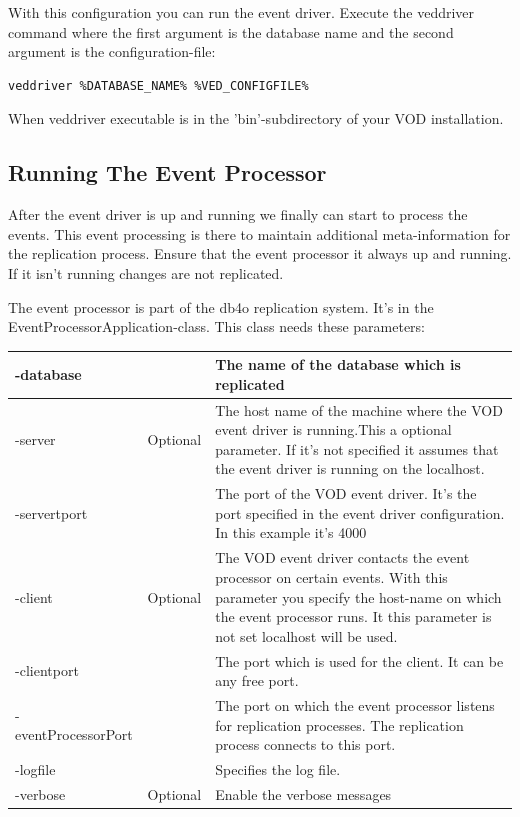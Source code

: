 With this configuration you can run the event driver. Execute the veddriver command where the first argument is the database name and the second argument is the configuration-file:

\begin{lstlisting}
veddriver %DATABASE_NAME% %VED_CONFIGFILE%
\end{lstlisting}

When veddriver executable is in the 'bin'-subdirectory of your VOD installation.

\subsection{Running The Event Processor}
\label{drs:db4o-replication-system-drs-vod-setup-event-processing:eventprocessor}

After the event driver is up and running we finally can start to process the events. This event processing is there to maintain additional meta-information for the replication process. Ensure that the event processor it always up and running. If it isn't running changes are not replicated.

The event processor is part of the db4o replication system. It's in the EventProcessorApplication-class. This class needs these parameters:

{\small
\begin{longtable}{|p{}|p{}|p{}|}
\hline
-database &  & The name of the database which is replicated \\ \hline
-server & Optional & The host name of the machine where the VOD event driver is running.This a optional parameter. If it's not specified it assumes that the event driver is running on the localhost. \\ \hline
-servertport &  & The port of the VOD event driver. It's the port specified in the event driver configuration. In this example it's 4000 \\ \hline
-client & Optional & The VOD event driver contacts the event processor on certain events. With this parameter you specify the host-name on which the event processor runs. It this parameter is not set localhost will be used. \\ \hline
-clientport &  & The port which is used for the client. It can be any free port. \\ \hline
-eventProcessorPort &  & The port on which the event processor listens for replication processes. The replication process connects to this port. \\ \hline
-logfile &  & Specifies the log file. \\ \hline
-verbose & Optional & Enable the verbose messages \\ \hline
\end{longtable}}

